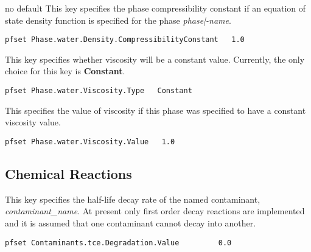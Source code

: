 {no default}
{This key specifies the phase compressibility constant 
if an equation of state density function is specified for the phase
{\em phase|-name}.}
\begin{display}\begin{verbatim}
pfset Phase.water.Density.CompressibilityConstant   1.0
\end{verbatim}\end{display}

{This key specifies whether viscosity will be a constant value.
Currently, the only choice for this key is {\bf Constant}.}
\begin{display}\begin{verbatim}
pfset Phase.water.Viscosity.Type   Constant
\end{verbatim}\end{display}

{This specifies the value of viscosity if this phase was specified to have a
constant viscosity value.}
\begin{display}\begin{verbatim}
pfset Phase.water.Viscosity.Value   1.0
\end{verbatim}\end{display}


\subsection{Chemical Reactions}
\label{Chemical Reactions}

{
This key specifies the half-life decay rate of the named contaminant,
{\em contaminant\_name}.  At present only first order decay reactions
are implemented and it is assumed that one contaminant cannot decay
into another.
}
\begin{display}\begin{verbatim}
pfset Contaminants.tce.Degradation.Value         0.0
\end{verbatim}\end{display}

